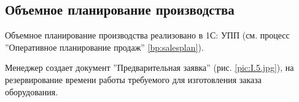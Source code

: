 \newpage
\subsection{Объемное планирование производства}
\label{bp:MonthPlan}

Объемное планирование производства реализовано в 1С: УПП (см. процесс ''Оперативное планирование продаж'' \ref{bp:salesplan}).

Менеджер создает документ ''Предварительная заявка'' (рис. \ref{pic:I.5.jpg}), на резервирование времени работы требуемого для изготовления заказа оборудования.

\clearpage










% 